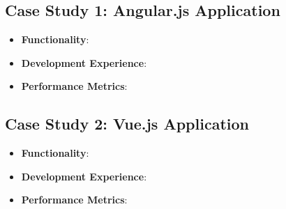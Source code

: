 \newpage

\subsection*{Case Study 1: Angular.js Application}

\begin{itemize}
    \item \textbf{Functionality}:
    \item \textbf{Development Experience}:
    \item \textbf{Performance Metrics}:
\end{itemize}

\subsection*{Case Study 2: Vue.js Application}

\begin{itemize}
    \item \textbf{Functionality}:
    \item \textbf{Development Experience}:
    \item \textbf{Performance Metrics}:
\end{itemize}
